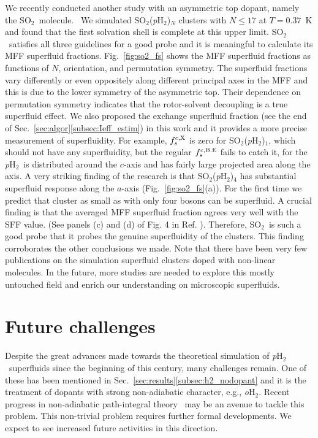 \documentclass[12pt]{iopart}
\newcommand{\sotwo}{SO$_2$}
\newcommand{\phtwo}{{\em p}H$_2$}
\newcommand{\ohtwo}{{\em o}H$_2$}
\begin{document}
We recently conducted another study with an asymmetric top dopant, namely the  \sotwo~molecule.~\cite{zeng_so2ph2} 
We simulated  \sotwo(\phtwo)$_N$ clusters with $N \le 17$ at $T=0.37$~K and found that the first solvation shell is complete at this upper limit. \sotwo~satisfies all three guidelines for a good probe and it is meaningful to calculate its MFF superfluid fractions. 
Fig.~\ref{fig:so2_fs} shows the MFF superfluid fractions as functions of $N$, orientation, and permutation symmetry. 
The superfluid fractions vary differently or even oppositely along different principal axes in the MFF and this is due to the lower symmetry of the asymmetric top. Their dependence on permutation symmetry indicates that the rotor-solvent decoupling is a true superfluid effect. 
We also proposed the exchange superfluid fraction (see the end of Sec.~\ref{sec:algor}\ref{subsec:Ieff_estim}) in this work and it provides a more precise measurement of superfluidity. 
For example, $f_s^{c,{\rm X}}$ is zero for \sotwo(\phtwo)$_1$, which should not have any superfluidity, but the regular $f_s^{c, {\rm B.E}}$ fails to catch it, for the \phtwo~is distributed around the $c$-axis and has fairly large projected area along the axis. 
A very striking finding of the research is that \sotwo(\phtwo)$_4$ has substantial superfluid response along the $a$-axis (Fig.~\ref{fig:so2_fs}(a)). For the first time we predict that cluster as small as with only four bosons can be superfluid. 
A crucial finding is that the averaged MFF superfluid fraction agrees very well with the SFF value.
(See panels (c) and (d) of Fig. 4 in Ref. \cite{zeng_so2ph2}).
Therefore, \sotwo~is such a good probe that it probes the genuine superfluidity of the clusters. This finding corroborates the other conclusions we made. 
Note that there have been very few publications on the simulation superfluid clusters doped with non-linear molecules. 
In the future, more studies are needed to explore this mostly untouched field and enrich our understanding on microscopic superfluids.

\section{Future challenges} \label{sec:challenge}

Despite the great advances made towards the theoretical simulation of \phtwo~superfluids since the beginning of this century, 
many challenges remain. 
One of these has been mentioned in Sec.~\ref{sec:results}\ref{subsec:h2_nodopant} and it is the treatment of dopants with strong non-adiabatic character, e.g., \ohtwo. 
Recent progress in non-adiabatic path-integral theory~\cite{schmidt_na_pi,ananth_semi_na,krishna_na_pi,hanasaki_na_pi,ananth_na_continuous,huo_na_pi,ananth_flux} may be an avenue to tackle this problem. 
This non-trivial problem requires further formal developments. We expect to see increased future activities in this direction.
\end{document}
